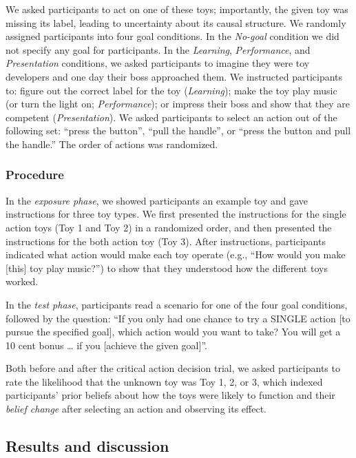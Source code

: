 \documentclass[10pt, letterpaper]{article}
\begin{document}
We asked participants to act on one of these toys; importantly, the
given toy was missing its label, leading to uncertainty about its causal
structure. We randomly assigned participants into four goal conditions.
In the \emph{No-goal} condition we did not specify any goal for
participants. In the \emph{Learning}, \emph{Performance}, and
\emph{Presentation} conditions, we asked participants to imagine they
were toy developers and one day their boss approached them. We
instructed participants to: figure out the correct label for the toy
(\emph{Learning}); make the toy play music (or turn the light on;
\emph{Performance}); or impress their boss and show that they are
competent (\emph{Presentation}). We asked participants to select an
action out of the following set: ``press the button'', ``pull the
handle'', or ``press the button and pull the handle.'' The order of
actions was randomized.

\subsubsection{Procedure}\label{procedure}

In the \emph{exposure phase}, we showed participants an example toy and
gave instructions for three toy types. We first presented the
instructions for the single action toys (Toy 1 and Toy 2) in a
randomized order, and then presented the instructions for the both
action toy (Toy 3). After instructions, participants indicated what
action would make each toy operate (e.g., ``How would you make
{[}this{]} toy play music?'') to show that they understood how the
different toys worked.

In the \emph{test phase}, participants read a scenario for one of the
four goal conditions, followed by the question: ``If you only had one
chance to try a SINGLE action {[}to pursue the specified goal{]}, which
action would you want to take? You will get a 10 cent bonus \ldots{} if
you {[}achieve the given goal{]}''.

Both before and after the critical action decision trial, we asked
participants to rate the likelihood that the unknown toy was Toy 1, 2,
or 3, which indexed participants' prior beliefs about how the toys were
likely to function and their \emph{belief change} after selecting an
action and observing its effect.

\subsection{Results and discussion}\label{results-and-discussion}
\end{document}
